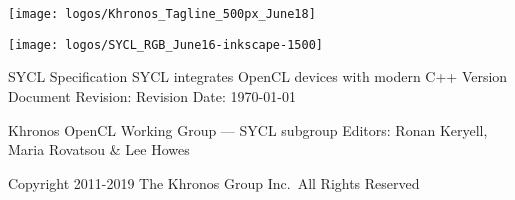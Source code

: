 \documentclass[10pt,twoside]{report}
\begin{document}

\ifx\showtodos\true
\listoftodos
\fi

\iffalse
\begin{lstlisting}{}
#include <CL/sycl.hpp>

  using namespace cl::sycl;
  SYCL_EXTERNAL void foo();
  // wrap our data variable in a buffer
  buffer<size_t, 1> resultBuf { data, range<1> { 1024 } };
  longlong16 big;
  ugenlonginteger very_generic;
  cl_program compatible;
      cgh.parallel_for<class simple_test>(range<1> { 1024 }, [=](id<1>
idx)

    std::cout << "data[" << i << "] = " << data[i] << std::endl;
\end{lstlisting}
\fi


\begin{titlepage}

\begin{center}

\begin{center}
\hfill\texttt{[image: logos/Khronos\_Tagline\_500px\_June18]}
\end{center}
\vskip 2cm

\begin{center}
\texttt{[image: logos/SYCL\_RGB\_June16-inkscape-1500]}
\end{center}

\vskip 1.5cm

{\Large SYCL\texttrademark{} Specification}
\vskip 0.5cm
{\Large SYCL\texttrademark{} integrates OpenCL\texttrademark{} devices
  with modern C++}
\vskip 1cm
{ Version \SYCLVERSION}
\vskip 0.2cm
{ Document Revision: \DOCUMENTVERSION}
\vskip 0.2cm
{ Revision Date: \today}


\vskip 1cm
{Khronos\textsuperscript{\textregistered} OpenCL\texttrademark{}
  Working Group --- SYCL\texttrademark{} subgroup}
\vskip 0.2cm
{Editors: Ronan Keryell, Maria Rovatsou \& Lee Howes}

\vskip 1cm
\vbox{\hrulefill}
\vbox{Copyright 2011-2019 The Khronos\textregistered{} Group Inc.\ All
  Rights Reserved}
\end{center}

\end{titlepage}
\end{document}
